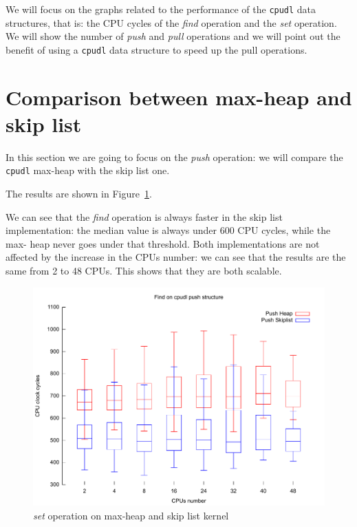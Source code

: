 We will focus on the graphs related to the performance of the \texttt{cpudl} data
structures, that is: the CPU cycles of the \emph{find} operation and the \emph{set}
operation. We will show the number of \emph{push} and \emph{pull} 
operations and we will point out the benefit of using a \texttt{cpudl} data structure
to speed up the pull operations.

\section{Comparison between max-heap and skip list\label{sec:heap_vs_skiplist}}

In this section we are going to focus on the \emph{push} operation: we will compare
the \texttt{cpudl} max-heap with the skip list one.

The results are shown in Figure~\ref{fig:heap_skiplist_find}. 

We can see that the \emph{find} operation is always faster in the skip list
implementation: the median value is always under 600 CPU cycles, while the max-
heap never goes under that threshold. Both implementations are not affected by
the increase in the CPUs number: we can see that the results are the same from
2 to 48 CPUs. This shows that they are both scalable.

\begin{figure}[htbp]
    \includegraphics[width=\columnwidth]{images/heap_skiplist_find.pdf}
    \caption{\emph{set} operation on max-heap and skip list kernel}
    \label{fig:heap_skiplist_find}
\end{figure}

